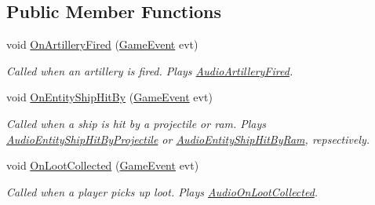\subsection*{Public Member Functions}
\begin{DoxyCompactItemize}
\item 
void \hyperlink{class_skyrates_1_1_audio_1_1_audio_dispatcher_ad24c31da906c494141e5fcf9c739ef6a}{On\-Artillery\-Fired} (\hyperlink{class_skyrates_1_1_game_1_1_event_1_1_game_event}{Game\-Event} evt)
\begin{DoxyCompactList}\small\item\em Called when an artillery is fired. Plays \hyperlink{class_skyrates_1_1_audio_1_1_audio_dispatcher_aea6c867e733dcc4dbbf9b25b68aa4c08}{Audio\-Artillery\-Fired}. \end{DoxyCompactList}\item 
void \hyperlink{class_skyrates_1_1_audio_1_1_audio_dispatcher_ac307a670bd757e36effed39608ee1a79}{On\-Entity\-Ship\-Hit\-By} (\hyperlink{class_skyrates_1_1_game_1_1_event_1_1_game_event}{Game\-Event} evt)
\begin{DoxyCompactList}\small\item\em Called when a ship is hit by a projectile or ram. Plays \hyperlink{class_skyrates_1_1_audio_1_1_audio_dispatcher_ac1ed48f44711cc8117e0d4246c4c395f}{Audio\-Entity\-Ship\-Hit\-By\-Projectile} or \hyperlink{class_skyrates_1_1_audio_1_1_audio_dispatcher_a78f27d7e62592efb1f09fb343148c0e9}{Audio\-Entity\-Ship\-Hit\-By\-Ram}, repsectively. \end{DoxyCompactList}\item 
void \hyperlink{class_skyrates_1_1_audio_1_1_audio_dispatcher_a7fc7f3fefc6a2a81a769f46427072662}{On\-Loot\-Collected} (\hyperlink{class_skyrates_1_1_game_1_1_event_1_1_game_event}{Game\-Event} evt)
\begin{DoxyCompactList}\small\item\em Called when a player picks up loot. Plays \hyperlink{class_skyrates_1_1_audio_1_1_audio_dispatcher_a17aa664c4fd2364854b960dbb87d6f9c}{Audio\-On\-Loot\-Collected}. \end{DoxyCompactList}\end{DoxyCompactItemize}
